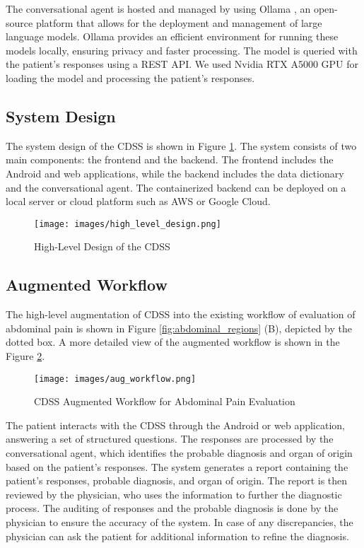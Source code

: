 \noindent The conversational agent is hosted and managed by using Ollama \cite{ollama}, an open-source platform that allows for the deployment and management of large language models. Ollama provides an efficient environment for running these models locally, ensuring privacy and faster processing. The model is queried with the patient's responses using a REST API. We used Nvidia RTX A5000 GPU for loading the model and processing the patient's responses.

\subsection{System Design}
The system design of the CDSS is shown in Figure \ref{fig:high_level_design}. The system consists of two main components: the frontend and the backend. The frontend includes the Android and web applications, while the backend includes the data dictionary and the conversational agent. The containerized backend can be deployed on a local server or cloud platform such as AWS or Google Cloud.
\begin{figure}[H]
    \centering
    \texttt{[image: images/high\_level\_design.png]}
    \caption{High-Level Design of the CDSS}
    \label{fig:high_level_design}
\end{figure}

\subsection{Augmented Workflow}
The high-level augmentation of CDSS into the existing workflow of evaluation of abdominal pain is shown in Figure \ref{fig:abdominal_regions} (B), depicted by the dotted box. A more detailed view of the augmented workflow is shown in the Figure \ref{fig:aug_workflow}.
\begin{figure}[H]
    \centering
    \texttt{[image: images/aug\_workflow.png]}
    \caption{CDSS Augmented Workflow for Abdominal Pain Evaluation}
    \label{fig:aug_workflow}
\end{figure}

\noindent The patient interacts with the CDSS through the Android or web application, answering a set of structured questions. The responses are processed by the conversational agent, which identifies the probable diagnosis and organ of origin based on the patient's responses. The system generates a report containing the patient's responses, probable diagnosis, and organ of origin. The report is then reviewed by the physician, who uses the information to further the diagnostic process. The auditing of responses and the probable diagnosis is done by the physician to ensure the accuracy of the system. In case of any discrepancies, the physician can ask the patient for additional information to refine the diagnosis.

